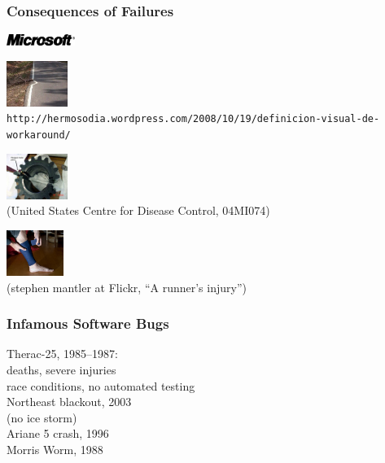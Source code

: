 \documentclass{beamer}
\newenvironment{changemargin}[1]{%
  \begin{list}{}{%
    \setlength{\topsep}{0pt}%
    \setlength{\leftmargin}{#1}%
    \setlength{\rightmargin}{1em}
    \setlength{\listparindent}{\parindent}%
    \setlength{\itemindent}{\parindent}%
    \setlength{\parsep}{\parskip}%
  }%
  \item[]}{\end{list}}
\begin{document}
\begin{frame}
  \frametitle{Consequences of Failures}


\begin{center}
\includegraphics[height=1em]{L01/mslogo-1.jpg}
\end{center}


\begin{center}
\includegraphics[height=4em]{L01/workaround.jpg}\\
\tiny \tt http://hermosodia.wordpress.com/2008/10/19/definicion-visual-de-workaround/
\end{center}


\begin{center}
\includegraphics[height=4em]{L01/04MI074c.jpg}\\
\tiny (United States Centre for Disease Control, 04MI074)
\end{center}

\begin{center}
\includegraphics[height=4em]{L01/2873443918_ddc0337d19.jpg}\\
\tiny (stephen mantler at Flickr, ``A runner's injury'')
\end{center}

\end{frame}


\begin{frame}
  \frametitle{Infamous Software Bugs}
  \Large
  \begin{changemargin}{2em}
    Therac-25, 1985--1987: \\
     deaths, severe injuries\\
    \qquad race conditions, no automated testing\\[1em]
    Northeast blackout, 2003\\
    \qquad (no ice storm)\\[1em]
    Ariane 5 crash, 1996\\[1em]
    Morris Worm, 1988
    
  \end{changemargin}
\end{frame}
\end{document}
